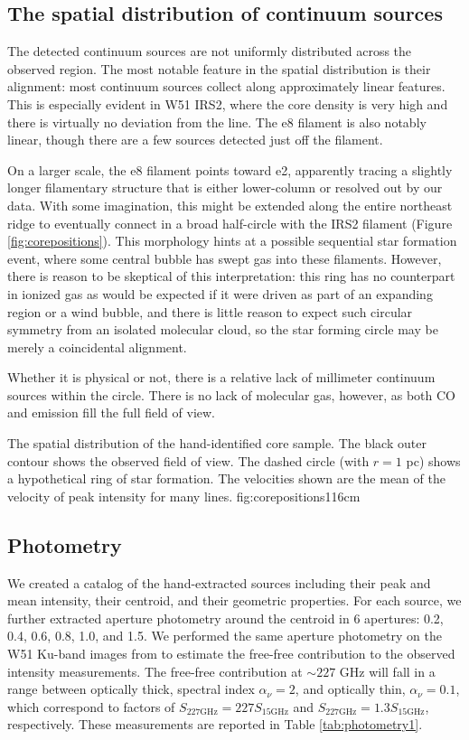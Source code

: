 \documentclass{emulateapj}
\begin{document}
\subsection{The spatial distribution of continuum sources}
\label{sec:corespatialdistribution}
The detected continuum sources are not uniformly distributed across the
observed region.  The most notable feature in the spatial distribution is their
alignment: most continuum sources collect along approximately linear features.
This is especially evident in W51 IRS2, where the core density is very high and
there is virtually no deviation from the line.  The e8 filament is also notably
linear, though there are a few sources detected just off the filament. 

On a larger scale, the e8 filament points toward e2, apparently tracing a
slightly longer filamentary structure that is either lower-column or resolved
out by our data.  With some imagination, this might be extended along the
entire northeast ridge to eventually connect in a broad half-circle with the
IRS2 filament (Figure \ref{fig:corepositions}).  This morphology hints at a
possible sequential star formation event, where some central bubble has swept
gas into these filaments.  However, there is reason to be skeptical of this
interpretation: this ring has no counterpart in ionized gas as would be
expected if it were driven as part of an expanding \hii region or a wind
bubble, and there is little reason to expect such circular symmetry from an
isolated molecular cloud, so the star forming circle may be merely a
coincidental alignment.

Whether it is physical or not, there is a relative lack of millimeter continuum
sources within the circle.  There is no lack of molecular gas, however, as both
CO and \formaldehyde emission fill the full field of view.

{The spatial distribution of the hand-identified core sample.
The black outer contour shows the observed field of view.  The dashed circle
(with $r=1$ pc) shows a hypothetical ring of star formation.
The velocities shown are the mean of the velocity of peak intensity for many
lines.
}{fig:corepositions}{1}{16cm}


\subsection{Photometry}
\label{sec:photometry}
We created a catalog of the hand-extracted sources including their peak and mean
intensity, their centroid, and their geometric properties.  For each source,
we further extracted aperture photometry around the centroid in 6 apertures:
0.2, 0.4, 0.6, 0.8, 1.0, and 1.5\arcsec.  We performed the same aperture
photometry on the W51 Ku-band images from \citet{Ginsburg2016a} to estimate the
free-free contribution to the observed intensity measurements.  The
free-free contribution at $\sim227$ GHz will fall in a range between optically
thick, spectral index $\alpha_\nu=2$, and optically thin, $\alpha_\nu=0.1$,
which correspond to factors of $S_{227 \mathrm{GHz}} = 227 S_{15 \mathrm{GHz}}$
and $S_{227 \mathrm{GHz}} = 1.3 S_{15 \mathrm{GHz}}$, respectively.  These
measurements are reported in Table
\ref{tab:photometry1}.
\end{document}
